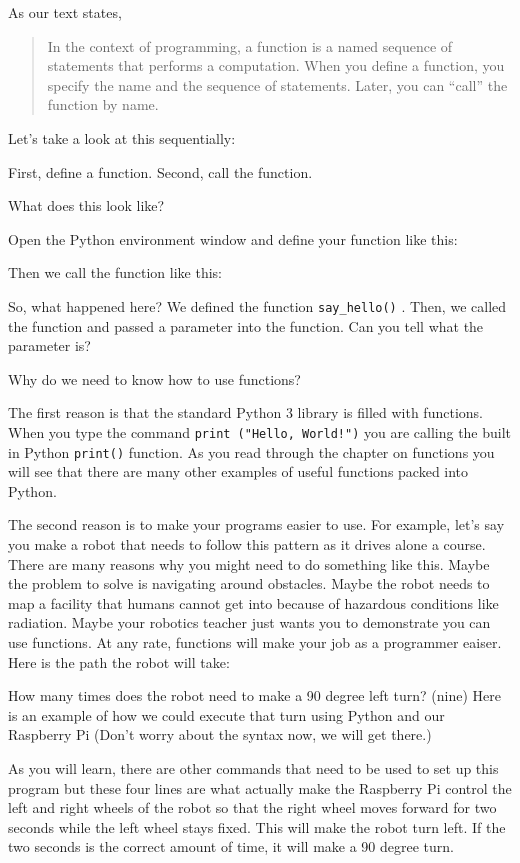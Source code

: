 \documentclass[
]{book}
\begin{document}
As our text states,

\begin{quote}
In the context of programming, a function is a named sequence of statements that performs a computation. When you define a function, you specify the name and the sequence of statements. Later, you can ``call'' the function by name.
\end{quote}

Let's take a look at this sequentially:

First, define a function. Second, call the function.

What does this look like?

Open the Python environment window and define your function like this:

Then we call the function like this:

So, what happened here? We defined the function \texttt{say\_hello()} . Then, we called the function and passed a parameter into the function. Can you tell what the parameter is?

Why do we need to know how to use functions?

The first reason is that the standard Python 3 library is filled with functions. When you type the command \texttt{print\ ("Hello,\ World!")} you are calling the built in Python \texttt{print()} function. As you read through the chapter on functions you will see that there are many other examples of useful functions packed into Python.

The second reason is to make your programs easier to use. For example, let's say you make a robot that needs to follow this pattern as it drives alone a course. There are many reasons why you might need to do something like this. Maybe the problem to solve is navigating around obstacles. Maybe the robot needs to map a facility that humans cannot get into because of hazardous conditions like radiation. Maybe your robotics teacher just wants you to demonstrate you can use functions. At any rate, functions will make your job as a programmer eaiser. Here is the path the robot will take:

How many times does the robot need to make a 90 degree left turn? (nine) Here is an example of how we could execute that turn using Python and our Raspberry Pi (Don't worry about the syntax now, we will get there.)

As you will learn, there are other commands that need to be used to set up this program but these four lines are what actually make the Raspberry Pi control the left and right wheels of the robot so that the right wheel moves forward for two seconds while the left wheel stays fixed. This will make the robot turn left. If the two seconds is the correct amount of time, it will make a 90 degree turn.
\end{document}
